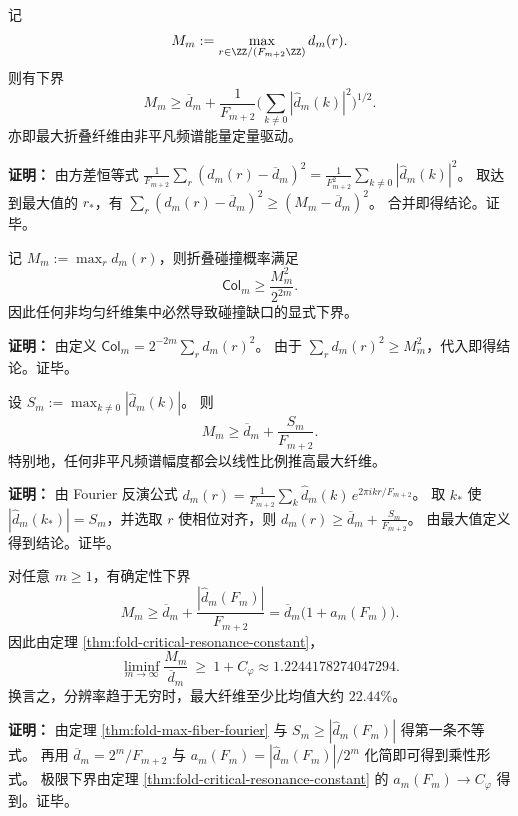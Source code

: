 \begin{theorem}[最大纤维与谱能量]
\label{thm:fold-max-fiber-spectrum}
记
\[
M_m:=\max_{r\in\ZZ/(F_{m+2}\ZZ)} d_m(r).
\]
则有下界
\[
M_m\ge \overline d_m+\frac{1}{F_{m+2}}\Biggl(\sum_{k\ne 0}|\widehat d_m(k)|^2\Biggr)^{1/2}.
\]
亦即最大折叠纤维由非平凡频谱能量定量驱动。
\end{theorem}

\textbf{证明：}
由方差恒等式
\(
\frac{1}{F_{m+2}}\sum_r(d_m(r)-\overline d_m)^2=\frac{1}{F_{m+2}^2}\sum_{k\ne 0}|\widehat d_m(k)|^2
\)。
取达到最大值的 $r_*$，有
\(
\sum_r(d_m(r)-\overline d_m)^2\ge (M_m-\overline d_m)^2
\)。
合并即得结论。证毕。

\begin{theorem}[最大纤维给出的碰撞下界]
\label{thm:fold-collision-max-fiber}
记 $M_m:=\max_r d_m(r)$，则折叠碰撞概率满足
\[
\mathsf{Col}_m\ge \frac{M_m^2}{2^{2m}}.
\]
因此任何非均匀纤维集中必然导致碰撞缺口的显式下界。
\end{theorem}

\textbf{证明：}
由定义
\(
\mathsf{Col}_m=2^{-2m}\sum_r d_m(r)^2
\)。
由于 $\sum_r d_m(r)^2\ge M_m^2$，代入即得结论。证毕。

\begin{theorem}
\label{thm:fold-max-fiber-fourier}
设
\(
S_m:=\max_{k\ne 0}|\widehat d_m(k)|
\)。
则
\[
M_m\ge \overline d_m+\frac{S_m}{F_{m+2}}.
\]
特别地，任何非平凡频谱幅度都会以线性比例推高最大纤维。
\end{theorem}

\textbf{证明：}
由 Fourier 反演公式
\(
d_m(r)=\frac{1}{F_{m+2}}\sum_k \widehat d_m(k)\,e^{2\pi i kr/F_{m+2}}
\)。
取 $k_*$ 使 $|\widehat d_m(k_*)|=S_m$，并选取 $r$ 使相位对齐，则
\(
d_m(r)\ge \overline d_m+\frac{S_m}{F_{m+2}}
\)。
由最大值定义得到结论。证毕。

\begin{corollary}\label{cor:fold-max-fiber-constant-bias}
对任意 \(m\ge 1\)，有确定性下界
\[
M_m\ge \overline d_m+\frac{|\widehat d_m(F_m)|}{F_{m+2}}
=\overline d_m\bigl(1+a_m(F_m)\bigr).
\]
因此由定理 \ref{thm:fold-critical-resonance-constant}，
\[
\liminf_{m\to\infty}\frac{M_m}{\overline d_m}\ \ge\ 1+C_\varphi
\approx 1.2244178274047294.
\]
换言之，分辨率趋于无穷时，最大纤维至少比均值大约 \(22.44\%\)。
\end{corollary}

\textbf{证明：}
由定理 \ref{thm:fold-max-fiber-fourier} 与 \(S_m\ge |\widehat d_m(F_m)|\) 得第一条不等式。
再用 \(\overline d_m=2^m/F_{m+2}\) 与 \(a_m(F_m)=|\widehat d_m(F_m)|/2^m\) 化简即可得到乘性形式。
极限下界由定理 \ref{thm:fold-critical-resonance-constant} 的 \(a_m(F_m)\to C_\varphi\) 得到。证毕。

